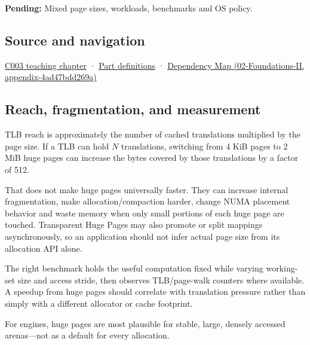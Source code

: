 \textbf{Pending:} Mixed page sizes, workloads, benchmarks and OS policy.

\subsection{Source and navigation}\label{appendix-ce688d1acdab-source-and-navigation}

\hyperref[01-foundations-i-ch002-where-the-bytes-live]{C003 teaching chapter} · \hyperref[appendix-fd090d982a15-m003---parts-41-60]{Part definitions} · \href{../02-Foundations-II/main.pdf\#nameddest=appendix-4ad47bdd269a}{Dependency Map (02-Foundations-II, appendix-4ad47bdd269a)}

\subsection{Reach, fragmentation, and measurement}\label{appendix-ce688d1acdab-reach-fragmentation-and-measurement}

TLB reach is approximately the number of cached translations multiplied by the page size. If a TLB can hold \(N\) translations, switching from 4 KiB pages to 2 MiB huge pages can increase the bytes covered by those translations by a factor of 512.

That does not make huge pages universally faster. They can increase internal fragmentation, make allocation/compaction harder, change NUMA placement behavior and waste memory when only small portions of each huge page are touched. Transparent Huge Pages may also promote or split mappings asynchronously, so an application should not infer actual page size from its allocation API alone.

The right benchmark holds the useful computation fixed while varying working-set size and access stride, then observes TLB/page-walk counters where available. A speedup from huge pages should correlate with translation pressure rather than simply with a different allocator or cache footprint.

For engines, huge pages are most plausible for stable, large, densely accessed arenas---not as a default for every allocation.
